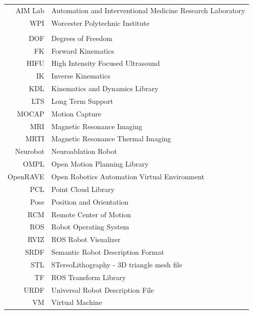 \documentclass[12pt]{report}
\begin{document}
\begin{tabular}{rl}
	AIM Lab& Automation and Interventional Medicine Research Laboratory\\
	WPI& Worcester Polytechnic Institute\\
	\\
	DOF& Degrees of Freedom\\
    FK& Forward Kinematics\\
    HIFU& High Intensity Focused Ultrasound\\
    IK& Inverse Kinematics\\
    KDL& Kinematics and Dynamics Library\\
    LTS& Long Term Support\\
	MOCAP& Motion Capture\\
    MRI& Magnetic Resonance Imaging\\
    MRTI& Magnetic Resonance Thermal Imaging\\
    Neurobot& Neuroablation Robot\\
    OMPL& Open Motion Planning Library\\
    OpenRAVE& Open Robotics Automation Virtual Environment\\
    PCL& Point Cloud Library\\
	Pose& Position and Orientation\\
    RCM& Remote Center of Motion\\
	ROS& Robot Operating System\\
	RVIZ& ROS Robot Visualizer \\
    SRDF& Semantic Robot Description Format\\
    STL& STereoLithography - 3D triangle mesh file\\
	TF& ROS Transform Library\\
	URDF& Universal Robot Description File\\
    VM& Virtual Machine\\
\end{tabular}

\todototoc
\listoftodos


\clearpage

\setcounter{page}{1}

\end{document}
